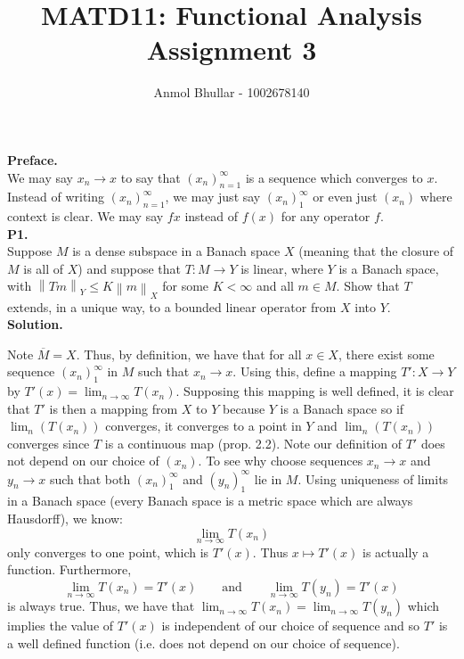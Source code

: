 \documentclass{article}
\title{MATD11: Functional Analysis\\
    Assignment 3}
\author{Anmol Bhullar - 1002678140}
\newcommand{\norm}[1]{\left\lVert#1\right\rVert}
\begin{document}
    \maketitle

    \textbf{Preface.}\\

    We may say $x_n\to x$ to say that $(x_n)_{n=1}^{\infty}$ is a sequence which converges to $x$. Instead of writing 
    $(x_n)_{n=1}^{\infty}$, we may just say $(x_n)_1^{\infty}$ or even just $(x_n)$ where context is clear.
    We may say $fx$ instead of $f(x)$ for any operator $f$.\\

    \textbf{P1.}\\

    Suppose $M$ is a dense subspace in a Banach space $X$ (meaning that the closure of $M$ is all of $X$) and suppose that
    $T:M\to Y$ is linear, where $Y$ is a Banach space, with $\norm{Tm}_Y \leq K\norm{m}_X$ for some $K<\infty$ and all $m\in M$.
    Show that $T$ extends, in a unique way, to a bounded linear operator from $X$ into $Y$.\\

    \textbf{Solution.}

    Note $\overline{M} = X$. Thus, by definition, we have that for all $x\in X$, there exist some sequence $(x_n)_1^{\infty}$ in $M$
    such that $x_n\to x$. Using this, define a mapping $T': X\to Y$ by $T'(x) = \lim_{n\to\infty} T(x_n)$. Supposing this mapping is well
    defined, it is clear that $T'$ is then a mapping from $X$ to $Y$ because $Y$ is a Banach space so if $\lim_n (T(x_n))$ converges,
    it converges to a point in $Y$ and $\lim_n (T(x_n))$ converges since $T$ is a continuous map (prop. 2.2).
    Note our definition of $T'$ does not depend on our choice
    of $(x_n)$. To see why choose sequences $x_n\to x$ and $y_n\to x$ such that both $(x_n)_1^{\infty}$ and $(y_n)_1^{\infty}$
    lie in $M$. Using uniqueness of limits in a Banach space (every Banach space is a metric space which are always Hausdorff),
    we know:
    \[ \lim_{n\to\infty} T(x_n) \]
    only converges to one point, which is $T'(x)$. Thus $x\mapsto T'(x)$ is actually a function. Furthermore, 
    \[ \lim_{n\to\infty} T(x_n) = T'(x)\qquad\text{and}\qquad\lim_{n\to\infty} T(y_n) = T'(x) \]
    is always true. Thus, we have that $\lim_{n\to\infty} T(x_n) = \lim_{n\to\infty} T(y_n)$ which implies the value of $T'(x)$
    is independent of our choice of sequence and so $T'$ is a well defined function (i.e. does not depend on our choice of sequence).\\
    
\end{document}
